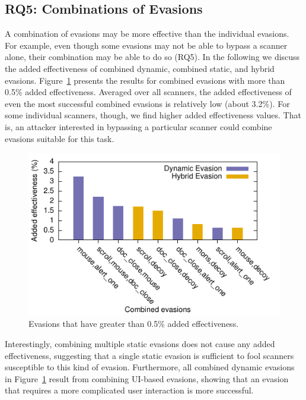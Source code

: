 \subsection{RQ5: Combinations of Evasions}
\label{ss:combinations}

A combination of evasions may be more effective than the individual evasions.
For example, even though some evasions may not be able to bypass a scanner alone, their combination may be able to do so (RQ5).
In the following we discuss the  added effectiveness of
combined dynamic, combined static, and hybrid evasions.
Figure~\ref{fig: added eff} presents the results for combined evasions with more than 0.5\% added effectiveness.
Averaged over all scanners, the added effectiveness of even the most successful combined evasions is relatively low (about 3.2\%).
For some individual scanners, though, we find higher added effectiveness values.
That is, an attacker interested in bypassing a particular scanner could combine evasions suitable for this task.

\begin{figure}[tb]
    \hspace{-.4em}\includegraphics{figures/added-eff}
    \caption{Evasions that have greater than 0.5\% added effectiveness.}
    \label{fig: added eff}
\end{figure}

Interestingly, combining multiple static evasions does not cause any added effectiveness, suggesting that a single static evasion is sufficient to fool scanners susceptible to this kind of evasion.
Furthermore, all combined dynamic evasions in Figure~\ref{fig: added eff} result from combining UI-based evasions, showing that an evasion that requires a more complicated user interaction is more successful.


